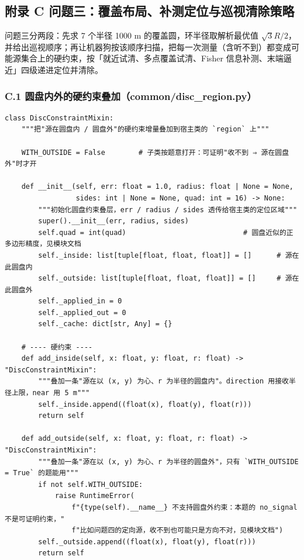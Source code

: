 \documentclass[UTF8, zihao=5,AutoFakeBold=2]{ctexart}
\begin{document}
\subsection*{附录 C \quad 问题三：覆盖布局、补测定位与巡视清除策略}

	\noindent 问题三分两段：先求 7 个半径 1000 m 的覆盖圆，环半径取解析最优值 $\sqrt{3}R/2$，并给出巡视顺序；再让机器狗按该顺序扫描，把每一次测量（含听不到）都变成可能源集合上的硬约束，按「就近试清、多点覆盖试清、Fisher 信息补测、末端逼近」四级递进定位并清除。

	\subsubsection*{C.1 \quad 圆盘内外的硬约束叠加（common/disc\_region.py）}
	\begin{lstlisting}
class DiscConstraintMixin:
    """把"源在圆盘内 / 圆盘外"的硬约束增量叠加到宿主类的 `region` 上"""

    WITH_OUTSIDE = False        # 子类按题意打开：可证明"收不到 ⇒ 源在圆盘外"时才开

    def __init__(self, err: float = 1.0, radius: float | None = None,
                 sides: int | None = None, quad: int = 16) -> None:
        """初始化圆盘约束叠层，err / radius / sides 透传给宿主类的定位区域"""
        super().__init__(err, radius, sides)
        self.quad = int(quad)                            # 圆盘近似的正多边形精度，见模块文档
        self._inside: list[tuple[float, float, float]] = []      # 源在此圆盘内
        self._outside: list[tuple[float, float, float]] = []     # 源在此圆盘外
        self._applied_in = 0
        self._applied_out = 0
        self._cache: dict[str, Any] = {}

    # ---- 硬约束 ----
    def add_inside(self, x: float, y: float, r: float) -> "DiscConstraintMixin":
        """叠加一条"源在以 (x, y) 为心、r 为半径的圆盘内"。direction 用接收半径上限，near 用 5 m"""
        self._inside.append((float(x), float(y), float(r)))
        return self

    def add_outside(self, x: float, y: float, r: float) -> "DiscConstraintMixin":
        """叠加一条"源在以 (x, y) 为心、r 为半径的圆盘外"，只有 `WITH_OUTSIDE = True` 的题能用"""
        if not self.WITH_OUTSIDE:
            raise RuntimeError(
                f"{type(self).__name__} 不支持圆盘外约束：本题的 no_signal 不是可证明约束，"
                f"比如问题四的定向源，收不到也可能只是方向不对，见模块文档")
        self._outside.append((float(x), float(y), float(r)))
        return self


\end{lstlisting}
\end{document}
